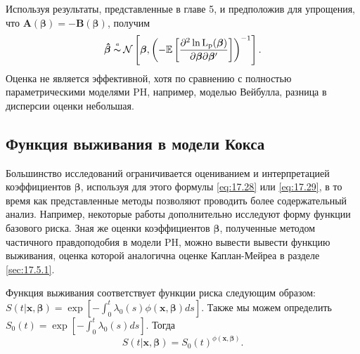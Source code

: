 Используя результаты, представленные в главе 5, %
и предположив для упрощения, что $\mathbf{A}(\bm{\beta})=-\mathbf{B}(\bm{\beta})$, получим
        \begin{align}
        \label{eq:17.35}
        \bm{\hat{\beta}}\thicksim\!\!\!\!\!^{{}^{a}}\hspace{0.1cm}\mathcal{N} \left[ \bm{\beta},\left(-\mathbb{E}\left[\frac{\partial^2\ln\mathrm{L_p}(\bm{\beta})}{\partial\bm{\beta}\partial\bm{\beta}'}\right]\right)^{-1} \right].
        \end{align}
Оценка не является эффективной, хотя по сравнению с полностью параметрическими моделями PH, например, моделью Вейбулла, разница в дисперсии оценки небольшая.


\subsection{Функция выживания в модели Кокса}\label{sec:17.8.3}

Большинство исследований ограничивается оцениванием и интерпретацией коэффициентов $\bm{\beta}$, используя для этого формулы \ref{eq:17.28} или \ref{eq:17.29}, в то время как представленные методы позволяют проводить более содержательный анализ. Например, некоторые работы дополнительно исследуют форму функции базового риска. Зная же оценки коэффициентов $\bm{\beta}$, полученные методом частичного правдоподобия в модели PH, можно вывести вывести функцию выживания, оценка которой аналогична оценке Каплан-Мейреа в разделе \ref{sec:17.5.1}.

Функция выживания соответствует функции риска следующим образом: $S(t|\mathbf{x},\bm{\beta})=\exp\left[-\int^{t}_{0}\lambda_0(s)\phi(\mathbf{x},\bm{\beta})ds\right]$. Также мы можем определить $S_0(t)=\exp\left[-\int^{t}_{0}\lambda_0(s)ds\right]$. Тогда
        $$S(t|\mathbf{x},\bm{\beta})=S_0(t)^{\phi(\mathbf{x},\bm{\beta})}.$$


